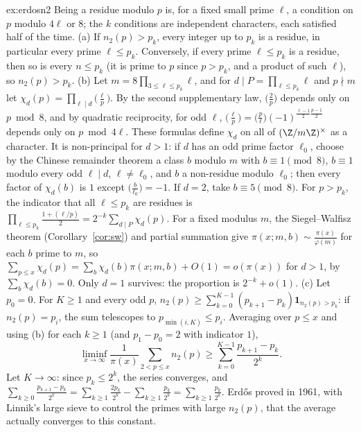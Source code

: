 \begin{solution}{ex:erdosn2}
\idea Being a residue modulo $p$ is, for a fixed small prime $\ell$, a condition on $p$ modulo $4\ell$ or $8$; the $k$ conditions are independent characters, each satisfied half of the time.
\writeup (a) If $n_2(p)>p_k$, every integer up to $p_k$ is a residue, in particular every prime $\ell\le p_k$. Conversely, if every prime $\ell\le p_k$ is a residue, then so is every $n\le p_k$ (it is prime to $p$ since $p>p_k$, and a product of such $\ell$), so $n_2(p)>p_k$.
(b) Let $m=8\prod_{3\le\ell\le p_k}\ell$, and for $d\mid P=\prod_{\ell\le p_k}\ell$ and $p\nmid m$ let $\chi_d(p)=\prod_{\ell\mid d}\bigl(\frac\ell p\bigr)$. By the second supplementary law, $\bigl(\frac2p\bigr)$ depends only on $p\bmod8$, and by quadratic reciprocity, for odd $\ell$, $\bigl(\frac\ell p\bigr)=\bigl(\frac p\ell\bigr)(-1)^{\frac{\ell-1}2\frac{p-1}2}$ depends only on $p\bmod4\ell$. These formulas define $\chi_d$ on all of $(\Z/m\Z)^\times$ as a character. It is non-principal for $d>1$: if $d$ has an odd prime factor $\ell_0$, choose by the Chinese remainder theorem a class $b$ modulo $m$ with $b\equiv1\pmod8$, $b\equiv1$ modulo every odd $\ell\mid d$, $\ell\ne\ell_0$, and $b$ a non-residue modulo $\ell_0$; then every factor of $\chi_d(b)$ is $1$ except $\bigl(\frac{b}{\ell_0}\bigr)=-1$. If $d=2$, take $b\equiv5\pmod8$.
For $p>p_k$, the indicator that all $\ell\le p_k$ are residues is $\prod_{\ell\le p_k}\frac{1+(\ell/p)}2=2^{-k}\sum_{d\mid P}\chi_d(p)$. For a fixed modulus $m$, the Siegel--Walfisz theorem (Corollary~\ref{cor:sw}) and partial summation give $\pi(x;m,b)\sim\frac{\pi(x)}{\varphi(m)}$ for each $b$ prime to $m$, so $\sum_{p\le x}\chi_d(p)=\sum_b\chi_d(b)\pi(x;m,b)+O(1)=o(\pi(x))$ for $d>1$, by $\sum_b\chi_d(b)=0$. Only $d=1$ survives: the proportion is $2^{-k}+o(1)$.
(c) Let $p_0=0$. For $K\ge1$ and every odd $p$, $n_2(p)\ge\sum_{k=0}^{K-1}(p_{k+1}-p_k)\mathbf 1_{n_2(p)>p_k}$: if $n_2(p)=p_i$, the sum telescopes to $p_{\min(i,K)}\le p_i$. Averaging over $p\le x$ and using (b) for each $k\ge1$ (and $p_1-p_0=2$ with indicator $1$),
\[
\liminf_{x\to\infty}\frac1{\pi(x)}\sum_{2<p\le x}n_2(p)\ge\sum_{k=0}^{K-1}\frac{p_{k+1}-p_k}{2^k}.
\]
Let $K\to\infty$: since $p_k\le2^{k}$, the series converges, and $\sum_{k\ge0}\frac{p_{k+1}-p_k}{2^k}=\sum_{k\ge1}\frac{2p_k}{2^k}-\sum_{k\ge1}\frac{p_k}{2^k}=\sum_{k\ge1}\frac{p_k}{2^k}$. Erdős proved in 1961, with Linnik's large sieve to control the primes with large $n_2(p)$, that the average actually converges to this constant.
\end{solution}

